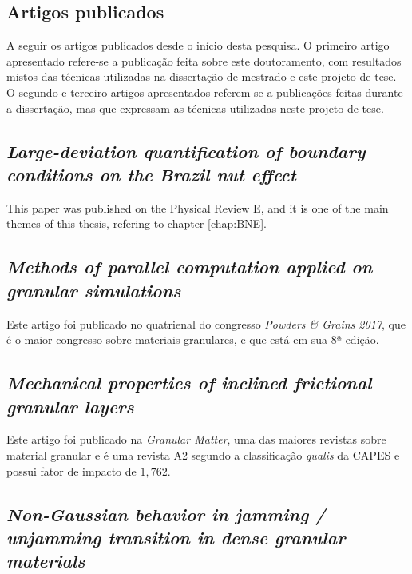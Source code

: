 \begin{apendicesenv}
\partapendices

\chapter{Artigos publicados}
\label{chap:Artigo}
    A seguir os artigos publicados desde o início desta pesquisa. O primeiro artigo apresentado refere-se a publicação feita sobre este doutoramento, com resultados mistos das técnicas utilizadas na dissertação de mestrado \cite{Dissertacao} e este projeto de tese. O segundo e terceiro artigos apresentados referem-se a publicações feitas durante a dissertação, mas que expressam as técnicas utilizadas neste projeto de tese.

\section{\textit{Large-deviation quantification of boundary conditions on the Brazil nut effect}}
\label{appendix:BNE}
    This paper was published on the Physical Review E, and it is one of the main themes of this thesis, refering to chapter \ref{chap:BNE}.

\section{\textit{Methods of parallel computation applied on granular simulations}}

    Este artigo foi publicado no quatrienal do congresso \textit{Powders \& Grains 2017}, que é o maior congresso sobre materiais granulares, e que está em sua 8ª edição.



\section{\textit{Mechanical properties of inclined frictional granular layers}}

    Este artigo foi publicado na \textit{Granular Matter}, uma das maiores revistas sobre material granular e é uma revista A2 segundo a classificação \textit{qualis} da CAPES e possui fator de impacto de $1,762$.



\section{\textit{Non-Gaussian behavior in jamming / unjamming transition in dense granular materials}}


\end{apendicesenv}
